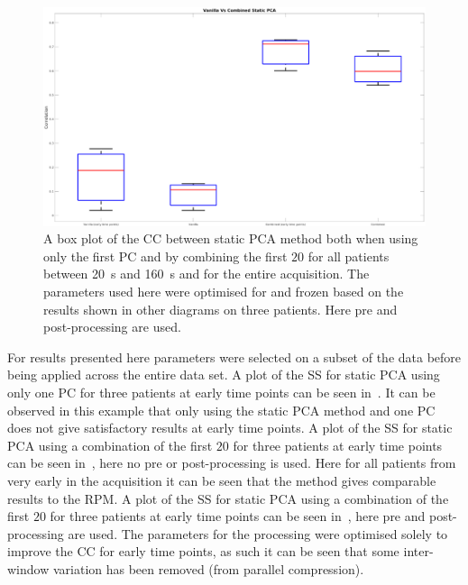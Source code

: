             \begin{figure}
                \centering
                
                \includegraphics[width=1.0\linewidth]{figures/data_driven_surrogate_signal_extraction_results_1_box_plot_processed.png}
                
                \captionsetup{singlelinecheck=false, justification=centering}
                \caption{A box plot of the \gls{CC} between static \gls{PCA} method both when using only the first \gls{PC} and by combining the first $20$  for all patients between \SI{20}{\second} and \SI{160}{\second} and for the entire acquisition. The parameters used here were optimised for and frozen based on the results shown in other diagrams on three patients. Here pre and post-processing are used.}
                \label{fig:pca_data_driven_surrogate_signal_extraction_methods_for_dynamic_pet_results_box_plot_processed}
            \end{figure}
            
            For results presented here parameters were selected on a subset of the data before being applied across the entire data set. A plot of the \gls{SS} for static \gls{PCA} using only one \gls{PC} for three patients at early time points can be seen in~. It can be observed in this example that only using the static \gls{PCA} method and one \gls{PC} does not give satisfactory results at early time points. A plot of the \gls{SS} for static \gls{PCA} using a combination of the first $20$  for three patients at early time points can be seen in~, here no pre or post-processing is used. Here for all patients from very early in the acquisition it can be seen that the method gives comparable results to the \gls{RPM}. A plot of the \gls{SS} for static \gls{PCA} using a combination of the first $20$  for three patients at early time points can be seen in~, here pre and post-processing are used. The parameters for the processing were optimised solely to improve the \gls{CC} for early time points, as such it can be seen that some inter-window variation has been removed (from parallel compression).
            
